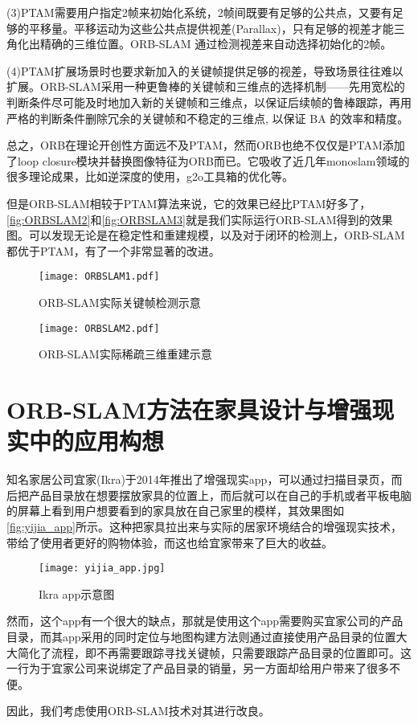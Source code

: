 (3)PTAM需要用户指定2帧来初始化系统，2帧间既要有足够的公共点，又要有足够的平移量。平移运动为这些公共点提供视差(Parallax)，只有足够的视差才能三角化出精确的三维位置。ORB-SLAM 通过检测视差来自动选择初始化的2帧。

(4)PTAM扩展场景时也要求新加入的关键帧提供足够的视差，导致场景往往难以扩展。ORB-SLAM采用一种更鲁棒的关键帧和三维点的选择机制——先用宽松的判断条件尽可能及时地加入新的关键帧和三维点，以保证后续帧的鲁棒跟踪，再用严格的判断条件删除冗余的关键帧和不稳定的三维点, 以保证 BA 的效率和精度。

总之，ORB在理论开创性方面远不及PTAM，然而ORB也绝不仅仅是PTAM添加了loop closure模块并替换图像特征为ORB而已。它吸收了近几年monoslam领域的很多理论成果，比如逆深度的使用，g2o工具箱的优化等。

但是ORB-SLAM相较于PTAM算法来说，它的效果已经比PTAM好多了，\autoref{fig:ORBSLAM2}和\autoref{fig:ORBSLAM3}就是我们实际运行ORB-SLAM得到的效果图。可以发现无论是在稳定性和重建规模，以及对于闭环的检测上，ORB-SLAM都优于PTAM，有了一个非常显著的改进。

\begin{figure}[!htbp]
\centering
\texttt{[image: ORBSLAM1.pdf]}
\caption{ORB-SLAM实际关键帧检测示意}
\label{fig:ORBSLAM2}
\end{figure}
\begin{figure}[!htbp]
\centering
\texttt{[image: ORBSLAM2.pdf]}
\caption{ORB-SLAM实际稀疏三维重建示意}
\label{fig:ORBSLAM3}
\end{figure}


\section{ORB-SLAM方法在家具设计与增强现实中的应用构想}
知名家居公司宜家(Ikra)于2014年推出了增强现实app，可以通过扫描目录页，而后把产品目录放在想要摆放家具的位置上，而后就可以在自己的手机或者平板电脑的屏幕上看到用户想要看到的家具放在自己家里的模样，其效果图如\autoref*{fig:yijia_app}所示。这种把家具拉出来与实际的居家环境结合的增强现实技术，带给了使用者更好的购物体验，而这也给宜家带来了巨大的收益。

\begin{figure}[!htbp]
\centering
\texttt{[image: yijia\_app.jpg]}
\caption{Ikra app示意图}
\label{fig:yijia_app}
\end{figure}

然而，这个app有一个很大的缺点，那就是使用这个app需要购买宜家公司的产品目录，而其app采用的同时定位与地图构建方法则通过直接使用产品目录的位置大大简化了流程，即不再需要跟踪寻找关键帧，只需要跟踪产品目录的位置即可。这一行为于宜家公司来说绑定了产品目录的销量，另一方面却给用户带来了很多不便。

因此，我们考虑使用ORB-SLAM技术对其进行改良。


